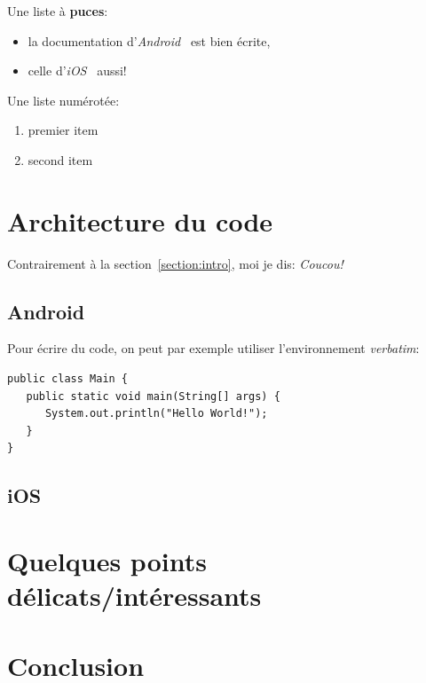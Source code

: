 \documentclass{article}
\begin{document}
Une liste à \textbf{puces}:
\begin{itemize}
\item la documentation d'\textit{Android}~\cite{androidDoc}
  est bien écrite,
\item celle d'\textit{iOS}~\cite{iosDoc} aussi!
\end{itemize}

Une liste numérotée:
\begin{enumerate}
\item premier item
\item second item
\end{enumerate}



\section{Architecture du code}
Contrairement à la section~\ref{section:intro},
moi je dis: \textit{Coucou!}

\subsection{Android} %
Pour écrire du code, on peut par exemple utiliser l'environnement
\textit{verbatim}:
\begin{verbatim}
public class Main {
   public static void main(String[] args) {
      System.out.println("Hello World!");
   }
}
\end{verbatim}

\subsection{iOS} %


\section{Quelques points délicats/intéressants}


\section{Conclusion}




\end{document}
